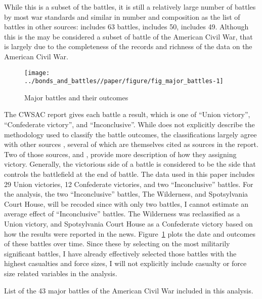 While this is a subset of the battles, it is still a relatively large number of battles by most war standards and similar in number and composition as the list of battles in other sources: \textcite{Livermore1900} includes 63 battles, \textcite{Bodart1908} includes 50, \textcite{cdb90} includes 49.
Although this is the may be considered a subset of battle of the American Civil War, that is largely due to the completeness of the records and richness of the data on the American Civil War.

\begin{figure}[htpb]
  \centering
  \texttt{[image: ../bonds\_and\_battles//paper/figure/fig\_major\_battles-1]}
  \caption{Major battles and their outcomes}
  \label{bonds:fig:major_battles}
\end{figure}

The CWSAC report \parencite{CWSAC1993b} gives each battle a result, which is one of ``Union victory'', ``Confederate victory'', and ``Inconclusive''.
While \textcite{CWSAC1993} does not explicitly describe the methodology used to classify the battle outcomes, the classifications largely agree with other sources \parencites{fox1898regimental}{Livermore1900}{Bodart1908}{cdb90}, several of which are themselves cited as sources in the report.
Two of those sources, \textcite{fox1898regimental} and \textcite{Livermore1900}, provide more description of how they assigning victory.
Generally, the victorious side of a battle is considered to be the side that controls the battlefield at the end of battle.
The data used in this paper includes 29 Union victories, 12 Confederate victories, and two ``Inconclusive'' battles.
For the analysis, the two ``Inconclusive'' battles,  The Wilderness, and Spotsylvania Court House, will be recoded since with only two battles, I cannot estimate an average effect of ``Inconclusive'' battles.
The Wilderness was reclassified as a Union victory, and Spotsylvania Court House as a Confederate victory based on how the results were reported in the news.
Figure~\ref{bonds:fig:major_battles} plots the date and outcomes of these battles over time.%
Since these by selecting on the most militarily significant battles, I have already effectively selected those battles with the highest casualties and force sizes, I will not explicitly include casualty or force size related variables in the analysis.

\begin{table}
  \centering
  
  \caption{List of the 43 major battles of the American Civil War included in this analysis.}
  \label{bonds:tab:battles}
\end{table}

